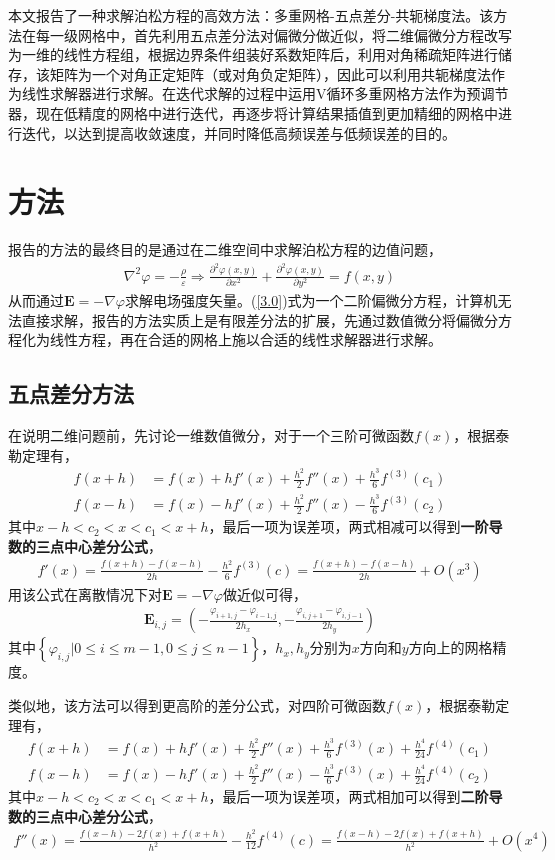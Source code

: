 \documentclass{article} %
\renewcommand{\vec}[1]{\boldsymbol{#1}} %
\begin{document}
本文报告了一种求解泊松方程的高效方法：多重网格-五点差分-共轭梯度法。该方法在每一级网格中，首先利用五点差分法对偏微分做近似，将二维偏微分方程改写为一维的线性方程组，根据边界条件组装好系数矩阵后，利用对角稀疏矩阵进行储存，该矩阵为一个对角正定矩阵（或对角负定矩阵），因此可以利用共轭梯度法作为线性求解器进行求解。在迭代求解的过程中运用V循环多重网格方法作为预调节器，现在低精度的网格中进行迭代，再逐步将计算结果插值到更加精细的网格中进行迭代，以达到提高收敛速度，并同时降低高频误差与低频误差的目的。

\section{方法}
报告的方法的最终目的是通过在二维空间中求解泊松方程的边值问题，
\begin{align}
    \nabla^2 \varphi = -\frac{\rho}{\varepsilon} \Rightarrow \frac{\partial^2 \varphi (x,y)}{\partial x^2}+\frac{\partial^2 \varphi (x,y)}{\partial y^2}=f(x,y) \label{3.0}
\end{align}
从而通过$\vec{E}=-\nabla \varphi$求解电场强度矢量。(\ref{3.0})式为一个二阶偏微分方程，计算机无法直接求解，报告的方法实质上是有限差分法的扩展，先通过数值微分将偏微分方程化为线性方程，再在合适的网格上施以合适的线性求解器进行求解。
\subsection{五点差分方法}
在说明二维问题前，先讨论一维数值微分，对于一个三阶可微函数$f(x)$，根据泰勒定理有，
\begin{align}
    f(x+h) & =f(x)+hf'(x)+\frac{h^2}{2}f''(x)+\frac{h^3}{6}f^{(3)}(c_1) \\
    f(x-h) & =f(x)-hf'(x)+\frac{h^2}{2}f''(x)-\frac{h^3}{6}f^{(3)}(c_2)
\end{align}
其中$x-h<c_2<x<c_1<x+h$，最后一项为误差项，两式相减可以得到\textbf{一阶导数的三点中心差分公式}，
\begin{align}
    f'(x)=\frac{f(x+h)-f(x-h)}{2h}-\frac{h^2}{6}f^{(3)}(c)=\frac{f(x+h)-f(x-h)}{2h}+O(x^3)
\end{align}
用该公式在离散情况下对$\vec{E}=-\nabla \varphi$做近似可得，
\begin{align}
    \vec{E}_{i,j}=\left(-\frac{\varphi_{i+1,j}-\varphi_{i-1,j}}{2h_x},-\frac{\varphi_{i,j+1}-\varphi_{i,j-1}}{2h_y}\right)
\end{align}
其中$\left\{\varphi_{i,j}|0\leq i\leq m-1,0\leq j\leq n-1\right\}$，$h_x,h_y$分别为$x$方向和$y$方向上的网格精度。

类似地，该方法可以得到更高阶的差分公式，对四阶可微函数$f(x)$，根据泰勒定理有，
\begin{align}
    f(x+h) & =f(x)+hf'(x)+\frac{h^2}{2}f''(x)+\frac{h^3}{6}f^{(3)}(x)+\frac{h^4}{24}f^{(4)}(c_1) \\
    f(x-h) & =f(x)-hf'(x)+\frac{h^2}{2}f''(x)-\frac{h^3}{6}f^{(3)}(x)+\frac{h^4}{24}f^{(4)}(c_2)
\end{align}
其中$x-h<c_2<x<c_1<x+h$，最后一项为误差项，两式相加可以得到\textbf{二阶导数的三点中心差分公式}，
\begin{align}
    f''(x)=\frac{f(x-h)-2f(x)+f(x+h)}{h^2}-\frac{h^2}{12}f^{(4)}(c)=\frac{f(x-h)-2f(x)+f(x+h)}{h^2}+O(x^4)
\end{align}
\end{document}
